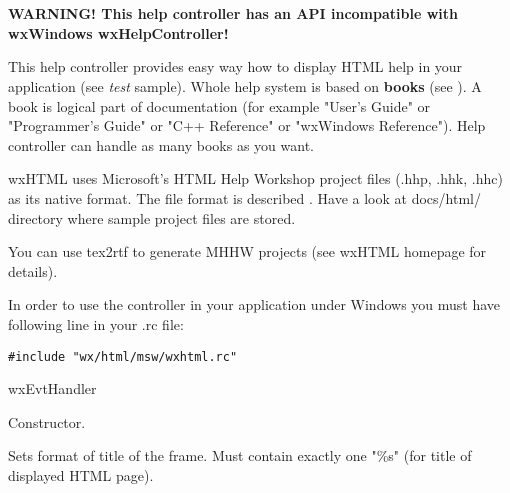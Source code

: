 %
%

\section{}\label{wxhtmlhelpcontroller}

{\bf WARNING! This help controller has an API incompatible with wxWindows
wxHelpController!}

This help controller provides easy way how to display HTML help in your
application (see {\it test} sample). Whole help system is based on {\bf books}
(see ). A book is logical
part of documentation (for example "User's Guide" or "Programmer's Guide" or
"C++ Reference" or "wxWindows Reference"). Help controller can handle as
many books as you want.

wxHTML uses Microsoft's HTML Help Workshop project files (.hhp, .hhk, .hhc) as its
native format. The file format is described .
Have a look at docs/html/ directory where sample project files are stored.

You can use tex2rtf to generate MHHW projects (see wxHTML homepage for details).

In order to use the controller in your application under Windows you must
have following line in your .rc file:

\begin{verbatim}
#include "wx/html/msw/wxhtml.rc"
\end{verbatim}


wxEvtHandler


\label{wxhtmlhelpcontrollerwxhtmlhelpcontroller}


Constructor.

\label{wxhtmlhelpcontrollersettitleformat}


Sets format of title of the frame. Must contain exactly one "\%s"
(for title of displayed HTML page).

\label{wxhtmlhelpcontrollersettempdir}


